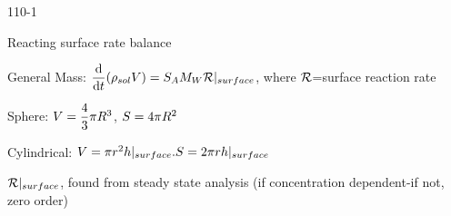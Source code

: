 \begin{mitframe}{110-1}
\begin{listone}
 \item Reacting surface rate balance
 \item General Mass: $\dfrac{\mathrm{d}}{\mathrm{d}\timet}(\dens_{sol}\vol)=\entropy_{\helmholtz}\mw\surfreac|_{surface}$, where $\surfreac$=surface reaction rate
 		\begin{listtwo}
        	\item Sphere: $\vol=\dfrac{4}{3}\pi\gasconst^3$,    $\entropy=4\pi\gasconst^2$
            \item Cylindrical: $\vol=\pi\pos^2\heattranscoeff|_{surface}. \entropy=2\pi\pos\heattranscoeff|_{surface}$
            \item $\surfreac|_{surface}$, found from steady state analysis (if concentration dependent-if not, zero order)
        \end{listtwo}
\end{listone}    
\end{mitframe}